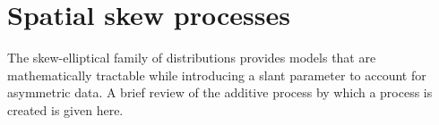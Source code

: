 

\section{Spatial skew processes}\label{sts:spatialskew}

The skew-elliptical family of distributions provides models that are mathematically tractable while introducing a slant parameter to account for asymmetric data.
A brief review of the additive process \citep[p. 129]{Azzalini2014} by which a \skewt{} process is created is given here.

